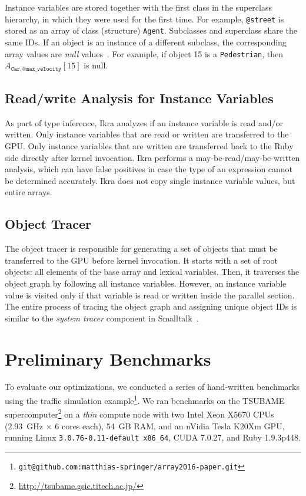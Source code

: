 \documentclass[preprint]{sigplanconf}
\begin{document}
Instance variables are stored together with the first class in the superclass hierarchy, in which they were used for the first time. For example, \texttt{@street} is stored as an array of class (structure) \texttt{Agent}. Subclasses and superclass share the same IDs. If an object is an instance of a different subclass, the corresponding array values are \emph{null} values~\cite{Mattis:2015:COI:2814228.2814230}. For example, if object 15 is a \texttt{Pedestrian}, then $A_{\texttt{Car}, \texttt{@max\_velocity}}[15]$ is null.

\subsection{Read/write Analysis for Instance Variables}
\label{sec:impl_copyback}
As part of type inference, Ikra analyzes if an instance variable is read and/or written. Only instance variables that are read or written are transferred to the GPU. Only instance variables that are written are transferred back to the Ruby side directly after kernel invocation. Ikra performs a may-be-read/may-be-written analysis, which can have false positives in case the type of an expression cannot be determined accurately. Ikra does not copy single instance variable values, but entire arrays.

\subsection{Object Tracer}
\label{sec:impl_tracer}
The object tracer is responsible for generating a set of objects that must be transferred to the GPU before kernel invocation. It starts with a set of root objects: all elements of the base array and lexical variables. Then, it traverses the object graph by following all instance variables. However, an instance variable value is visited only if that variable is read or written inside the parallel section. The entire process of tracing the object graph and assigning unique object IDs is similar to the \emph{system tracer} component in Smalltalk~\cite{Krasner:1983:SBH:226}.

\section{Preliminary Benchmarks}
To evaluate our optimizations, we conducted a series of hand-written benchmarks using the traffic simulation example\footnote{\texttt{git@github.com:matthias-springer/array2016-paper.git}}. We ran benchmarks on the TSUBAME supercomputer\footnote{\url{http://tsubame.gsic.titech.ac.jp/}} on a \emph{thin} compute node with two Intel Xeon X5670 CPUs (2.93~GHz $\times$ 6 cores each), 54~GB RAM, and an nVidia Tesla K20Xm GPU, running Linux \texttt{3.0.76-0.11-default x86\_64}, CUDA 7.0.27, and Ruby 1.9.3p448.
\end{document}
